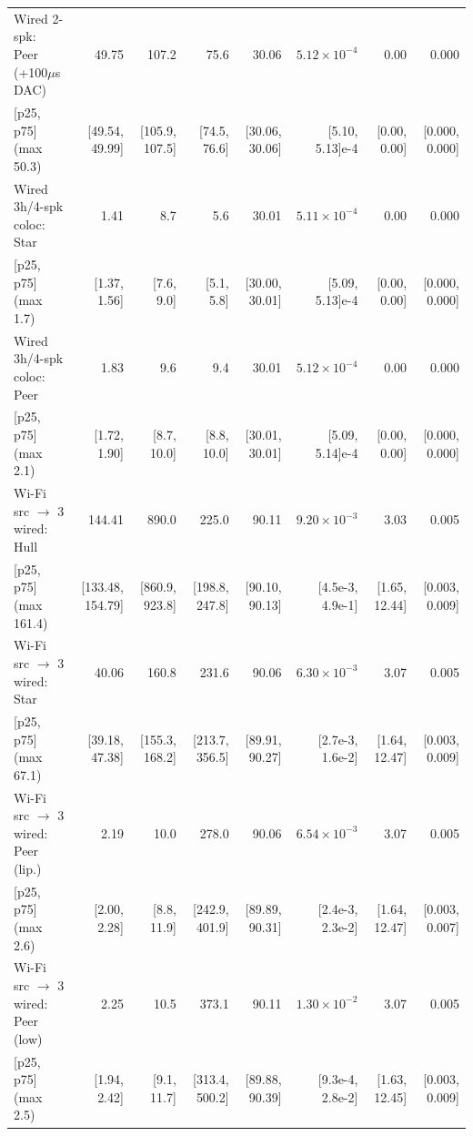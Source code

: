 \documentclass[11pt,a4paper]{article}
\theoremstyle{definition}
\begin{document}
\begin{table}[htb]
\begin{tabular}{@{}l r r r r r r r@{}}
\addlinespace[2pt]
Wired 2-spk: Peer (+100$\mu$s DAC) & 49.75 & 107.2 & 75.6 & 30.06 & $5.12{\times}10^{-4}$ & 0.00 & 0.000 \\[-1pt]
\quad\tiny [p25, p75] (max 50.3) & \tiny [49.54, 49.99] & \tiny [105.9, 107.5] & \tiny [74.5, 76.6] & \tiny [30.06, 30.06] & \tiny [5.10, 5.13]e-4 & \tiny [0.00, 0.00] & \tiny [0.000, 0.000] \\
\midrule
Wired 3h/4-spk coloc: Star & 1.41 & 8.7 & 5.6 & 30.01 & $5.11{\times}10^{-4}$ & 0.00 & 0.000 \\[-1pt]
\quad\tiny [p25, p75] (max 1.7) & \tiny [1.37, 1.56] & \tiny [7.6, 9.0] & \tiny [5.1, 5.8] & \tiny [30.00, 30.01] & \tiny [5.09, 5.13]e-4 & \tiny [0.00, 0.00] & \tiny [0.000, 0.000] \\
\addlinespace[2pt]
Wired 3h/4-spk coloc: Peer & 1.83 & 9.6 & 9.4 & 30.01 & $5.12{\times}10^{-4}$ & 0.00 & 0.000 \\[-1pt]
\quad\tiny [p25, p75] (max 2.1) & \tiny [1.72, 1.90] & \tiny [8.7, 10.0] & \tiny [8.8, 10.0] & \tiny [30.01, 30.01] & \tiny [5.09, 5.14]e-4 & \tiny [0.00, 0.00] & \tiny [0.000, 0.000] \\
\midrule
Wi-Fi src $\to$ 3 wired: Hull & 144.41 & 890.0 & 225.0 & 90.11 & $9.20{\times}10^{-3}$ & 3.03 & 0.005 \\[-1pt]
\quad\tiny [p25, p75] (max 161.4) & \tiny [133.48, 154.79] & \tiny [860.9, 923.8] & \tiny [198.8, 247.8] & \tiny [90.10, 90.13] & \tiny [4.5e-3, 4.9e-1] & \tiny [1.65, 12.44] & \tiny [0.003, 0.009] \\
\addlinespace[2pt]
Wi-Fi src $\to$ 3 wired: Star & 40.06 & 160.8 & 231.6 & 90.06 & $6.30{\times}10^{-3}$ & 3.07 & 0.005 \\[-1pt]
\quad\tiny [p25, p75] (max 67.1) & \tiny [39.18, 47.38] & \tiny [155.3, 168.2] & \tiny [213.7, 356.5] & \tiny [89.91, 90.27] & \tiny [2.7e-3, 1.6e-2] & \tiny [1.64, 12.47] & \tiny [0.003, 0.009] \\
\addlinespace[2pt]
Wi-Fi src $\to$ 3 wired: Peer (lip.) & 2.19 & 10.0 & 278.0 & 90.06 & $6.54{\times}10^{-3}$ & 3.07 & 0.005 \\[-1pt]
\quad\tiny [p25, p75] (max 2.6) & \tiny [2.00, 2.28] & \tiny [8.8, 11.9] & \tiny [242.9, 401.9] & \tiny [89.89, 90.31] & \tiny [2.4e-3, 2.3e-2] & \tiny [1.64, 12.47] & \tiny [0.003, 0.007] \\
\addlinespace[2pt]
Wi-Fi src $\to$ 3 wired: Peer (low) & 2.25 & 10.5 & 373.1 & 90.11 & $1.30{\times}10^{-2}$ & 3.07 & 0.005 \\[-1pt]
\quad\tiny [p25, p75] (max 2.5) & \tiny [1.94, 2.42] & \tiny [9.1, 11.7] & \tiny [313.4, 500.2] & \tiny [89.88, 90.39] & \tiny [9.3e-4, 2.8e-2] & \tiny [1.63, 12.45] & \tiny [0.003, 0.009] \\

\end{tabular}
\end{table}
\end{document}
